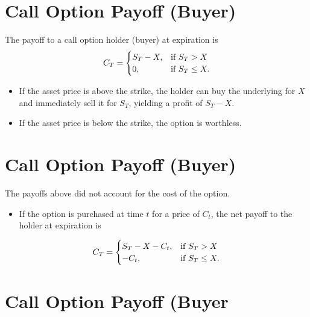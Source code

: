 \documentclass[letterpaper,10pt,english]{sphinxmanual}
\begin{document}
\section{Call Option Payoff (Buyer)}
\label{options:call-option-payoff-buyer}
The payoff to a call option holder (buyer) at expiration is
\begin{gather}
\begin{split}C_T = \begin{cases} S_T - X, & \text{if  } S_T > X \\ 0, &
\text{if  } S_T \leq X. \end{cases}\end{split}\notag
\end{gather}\begin{itemize}
\item {} 
If the asset price is above the strike, the holder can buy the
underlying for $X$ and immediately sell it for $S_T$,
yielding a profit of $S_T-X$.

\end{itemize}
\begin{itemize}
\item {} 
If the asset price is below the strike, the option is worthless.

\end{itemize}


\section{Call Option Payoff (Buyer)}
\label{options:id7}
The payoffs above did not account for the cost of the option.
\begin{itemize}
\item {} 
If the option is purchased at time $t$ for a price of
$C_t$, the net payoff to the holder at expiration is

\end{itemize}
\begin{gather}
\begin{split}C_T = \begin{cases} S_T - X - C_t, & \text{if  } S_T > X \\ -C_t, &
\text{if  } S_T \leq X. \end{cases}\end{split}\notag
\end{gather}

\section{Call Option Payoff (Buyer}
\label{options:id8}
$\qquad$
\end{document}

